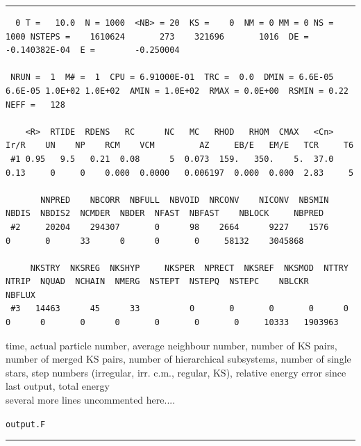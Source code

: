 \begin{landscape}
\vspace{1ex}
\noindent
\hrule

\vspace{1ex}
\noindent
\begin{minipage}[c]{18cm}
{\tiny
\begin{verbatim}
  0 T =   10.0  N = 1000  <NB> = 20  KS =    0  NM = 0 MM = 0 NS =  1000 NSTEPS =    1610624       273    321696       1016  DE =  -0.140382E-04  E =        -0.250004

 NRUN =  1  M# =  1  CPU = 6.91000E-01  TRC =  0.0  DMIN = 6.6E-05 6.6E-05 1.0E+02 1.0E+02  AMIN = 1.0E+02  RMAX = 0.0E+00  RSMIN = 0.22  NEFF =   128

    <R>  RTIDE  RDENS   RC      NC   MC   RHOD   RHOM  CMAX   <Cn>  Ir/R    UN    NP    RCM    VCM         AZ     EB/E   EM/E   TCR     T6
 #1 0.95   9.5   0.21  0.08      5  0.073  159.   350.    5.  37.0  0.13     0     0    0.000  0.0000   0.006197  0.000  0.000  2.83     5

       NNPRED    NBCORR  NBFULL  NBVOID  NRCONV    NICONV  NBSMIN  NBDIS  NBDIS2  NCMDER  NBDER  NFAST  NBFAST    NBLOCK     NBPRED
 #2     20204    294307       0      98    2664      9227    1576      0       0      33      0      0       0     58132    3045868

     NKSTRY  NKSREG  NKSHYP     NKSPER  NPRECT  NKSREF  NKSMOD  NTTRY  NTRIP  NQUAD  NCHAIN  NMERG  NSTEPT  NSTEPQ  NSTEPC    NBLCKR    NBFLUX
 #3   14463      45      33          0       0       0       0      0      0      0       0      0       0       0       0     10333   1903963
\end{verbatim}
}
time, actual particle number, average neighbour number, number of KS pairs,
number of merged KS pairs, number of hierarchical subsystems, number of single
stars, step numbers (irregular, irr. c.m., regular, KS), relative energy error
since last output, total energy\\
several more lines uncommented here....
\end{minipage} \hfill
%
\begin{minipage}{4.5cm}
\begin{center}
{\tt output.F}
\end{center}
\end{minipage}

\vspace{2ex}
\noindent
\hrule




\end{landscape}
